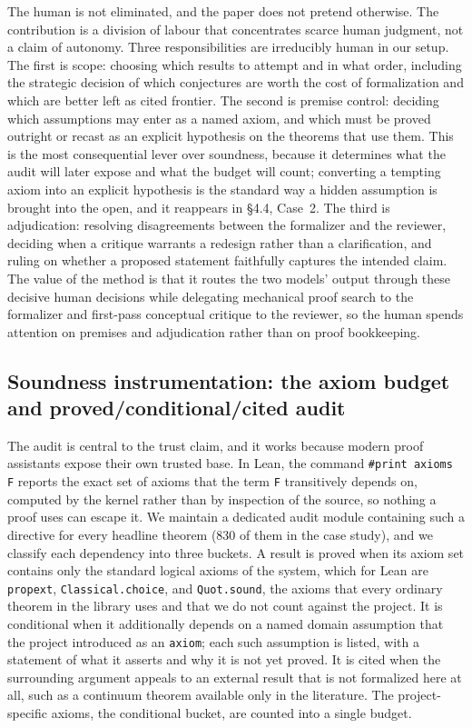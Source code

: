 \documentclass[11pt]{article}
\begin{document}
The human is not eliminated, and the paper does not pretend otherwise. The contribution is a division
of labour that concentrates scarce human judgment, not a claim of autonomy. Three responsibilities
are irreducibly human in our setup. The first is scope: choosing which results to attempt and in what
order, including the strategic decision of which conjectures are worth the cost of formalization and
which are better left as cited frontier. The second is premise control: deciding which assumptions
may enter as a named axiom, and which must be proved outright or recast as an explicit hypothesis on
the theorems that use them. This is the most consequential lever over soundness, because it
determines what the audit will later expose and what the budget will count; converting a tempting
axiom into an explicit hypothesis is the standard way a hidden assumption is brought into the open,
and it reappears in \S4.4, Case~2. The third is adjudication: resolving disagreements between the
formalizer and the reviewer, deciding when a critique warrants a redesign rather than a
clarification, and ruling on whether a proposed statement faithfully captures the intended claim. The
value of the method is that it routes the two models' output through these decisive human decisions
while delegating mechanical proof search to the formalizer and first-pass conceptual critique to the
reviewer, so the human spends attention on premises and adjudication rather than on proof
bookkeeping.

\subsection{Soundness instrumentation: the axiom budget and proved/conditional/cited audit}

The audit is central to the trust claim, and it works because modern proof assistants expose their
own trusted base. In Lean, the command \texttt{\#print axioms F} reports the exact set of axioms that
the term \texttt{F} transitively depends on, computed by the kernel rather than by inspection of the
source, so nothing a proof uses can escape it. We maintain a dedicated audit module containing such a
directive for every headline theorem (830 of them in the case study), and we classify each dependency
into three buckets. A result is proved when its axiom set contains only the standard logical axioms of
the system, which for Lean are \texttt{propext}, \texttt{Classical.choice}, and \texttt{Quot.sound},
the axioms that every ordinary theorem in the library uses and that we do not count against the
project. It is conditional when it additionally depends on a named domain assumption that the project
introduced as an \texttt{axiom}; each such assumption is listed, with a statement of what it asserts
and why it is not yet proved. It is cited when the surrounding argument appeals to an external result
that is not formalized here at all, such as a continuum theorem available only in the literature. The
project-specific axioms, the conditional bucket, are counted into a single budget.
\end{document}
